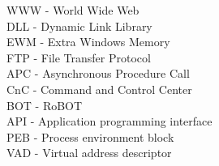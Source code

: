 WWW - World Wide Web \\
DLL - Dynamic Link Library \\
EWM - Extra Windows Memory \\
FTP - File Transfer Protocol \\
APC - Asynchronous Procedure Call \\
CnC - Command and Control Center \\
BOT - RoBOT \\
API - Application programming interface \\
PEB - Process environment block \\
VAD - Virtual address descriptor \\